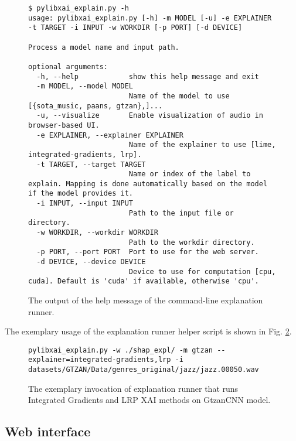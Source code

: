\documentclass[
    bindingoffset=5mm,  %
    footnoteindent=3mm, %
    hyphenation=true    %
]{src/wut-thesis}
\begin{document}
\begin{figure}%
\begin{verbatim}
$ pylibxai_explain.py -h
usage: pylibxai_explain.py [-h] -m MODEL [-u] -e EXPLAINER -t TARGET -i INPUT -w WORKDIR [-p PORT] [-d DEVICE]

Process a model name and input path.

optional arguments:
  -h, --help            show this help message and exit
  -m MODEL, --model MODEL
                        Name of the model to use [{sota_music, paans, gtzan},]...
  -u, --visualize       Enable visualization of audio in browser-based UI.
  -e EXPLAINER, --explainer EXPLAINER
                        Name of the explainer to use [lime, integrated-gradients, lrp].
  -t TARGET, --target TARGET
                        Name or index of the label to explain. Mapping is done automatically based on the model if the model provides it.
  -i INPUT, --input INPUT
                        Path to the input file or directory.
  -w WORKDIR, --workdir WORKDIR
                        Path to the workdir directory.
  -p PORT, --port PORT  Port to use for the web server.
  -d DEVICE, --device DEVICE
                        Device to use for computation [cpu, cuda]. Default is 'cuda' if available, otherwise 'cpu'.
\end{verbatim}
\caption{The output of the help message of the command-line explanation runner.}
\label{fig:CmdlineParameters}
\end{figure}

The exemplary usage of the explanation runner helper script is shown in Fig. \ref{fig:ExemplaryCmdline}.

\begin{figure}%
\begin{verbatim}
pylibxai_explain.py -w ./shap_expl/ -m gtzan --explainer=integrated-gradients,lrp -i datasets/GTZAN/Data/genres_original/jazz/jazz.00050.wav
\end{verbatim}
\caption{The exemplary invocation of explanation runner that runs Integrated Gradients and LRP XAI methods on GtzanCNN model.}
\label{fig:ExemplaryCmdline}
\end{figure}

\subsection{Web interface} \label{ch4:NotificationPanel}
\end{document}
